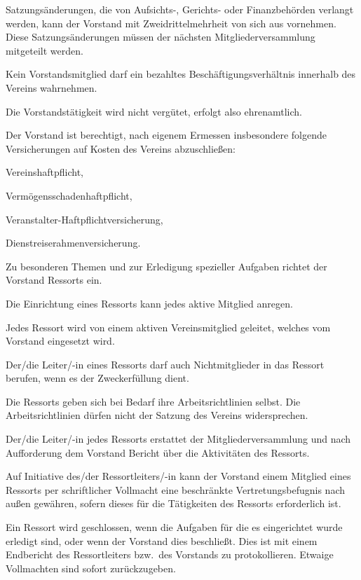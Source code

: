 \documentclass[draft]{scrartcl}
\begin{document}
\begin{contract}
Satzungsänderungen, die von Aufsichts-, Gerichts- oder Finanzbehörden verlangt
werden, kann der Vorstand mit Zweidrittelmehrheit von sich aus vornehmen.
Diese Satzungsänderungen müssen der nächsten Mitgliederversammlung mitgeteilt
werden.


Kein Vorstandsmitglied darf ein bezahltes Beschäftigungsverhältnis innerhalb
des Vereins wahrnehmen.

Die Vorstandstätigkeit wird nicht vergütet, erfolgt also ehrenamtlich.

\pagebreak\enlargethispage{\textheight}
Der Vorstand ist berechtigt, nach eigenem Ermessen insbesondere folgende
Versicherungen auf Kosten des Vereins abzuschließen:
\begin{compactenum}[\hspace{2em}1.]
  \item Vereinshaftpflicht,
  \item Vermögensschadenhaftpflicht,
  \item Veranstalter-Haftpflichtversicherung,
  \item Dienstreiserahmenversicherung.
\end{compactenum}


Zu besonderen Themen und zur Erledigung spezieller Aufgaben richtet der
Vorstand Ressorts ein.

Die Einrichtung eines Ressorts kann jedes aktive Mitglied anregen.

Jedes Ressort wird von einem aktiven Vereinsmitglied geleitet, welches vom
Vorstand eingesetzt wird.

Der/die Leiter/-in eines Ressorts darf auch Nichtmitglieder in das Ressort
berufen, wenn es der Zweckerfüllung dient.

Die Ressorts geben sich bei Bedarf ihre Arbeitsrichtlinien selbst. Die
Arbeitsrichtlinien dürfen nicht der Satzung des Vereins widersprechen.

Der/die Leiter/-in jedes Ressorts erstattet der Mitgliederversammlung und nach
Auf\/\-for\-derung dem Vorstand Bericht über die Aktivitäten des Ressorts.

Auf Initiative des/der Ressortleiters/-in kann der Vorstand einem Mitglied
eines Ressorts per schriftlicher Vollmacht eine beschränkte
Vertretungsbefugnis nach außen gewähren, sofern dieses für die Tätigkeiten des
Ressorts erforderlich ist.

Ein Ressort wird geschlossen, wenn die Aufgaben für die es eingerichtet wurde
erledigt sind, oder wenn der Vorstand dies beschließt. Dies ist mit einem
Endbericht des Ressortleiters bzw.\ des Vorstands zu protokollieren. Etwaige
Vollmachten sind sofort zurückzugeben.


\end{contract}
\end{document}
